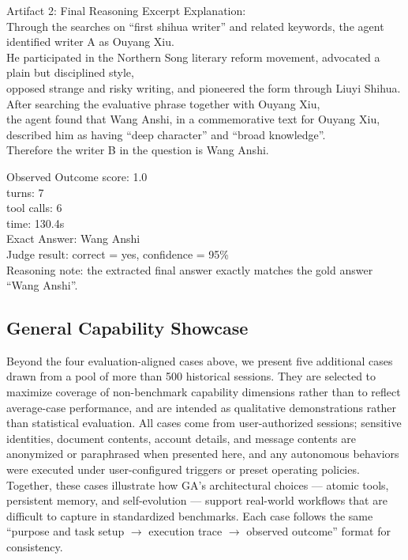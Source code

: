 \begin{CaseTraceBox}{Artifact 2: Final Reasoning Excerpt}
\small\ttfamily
Explanation: \\
Through the searches on ``first shihua writer'' and related keywords, the agent identified writer A as Ouyang Xiu. \\
He participated in the Northern Song literary reform movement, advocated a plain but disciplined style, \\
opposed strange and risky writing, and pioneered the form through Liuyi Shihua. \\
After searching the evaluative phrase together with Ouyang Xiu, \\
the agent found that Wang Anshi, in a commemorative text for Ouyang Xiu, \\
described him as having ``deep character'' and ``broad knowledge''. \\
Therefore the writer B in the question is Wang Anshi.
\end{CaseTraceBox}

\begin{CaseAnswerBox}{Observed Outcome}
\small\ttfamily
score: 1.0 \\
turns: 7 \\
tool calls: 6 \\
time: 130.4s \\
Exact Answer: Wang Anshi \\
Judge result: correct = yes, confidence = 95\% \\
Reasoning note: the extracted final answer exactly matches the gold answer ``Wang Anshi''.
\end{CaseAnswerBox}

\FloatBarrier

\subsection{General Capability Showcase}
\label{app:general_capability_showcase}

Beyond the four evaluation-aligned cases above, we present five additional cases drawn from a pool of more than 500 historical sessions.
They are selected to maximize coverage of non-benchmark capability dimensions rather than to reflect average-case performance, and are intended as qualitative demonstrations rather than statistical evaluation.
All cases come from user-authorized sessions; sensitive identities, document contents, account details, and message contents are anonymized or paraphrased when presented here, and any autonomous behaviors were executed under user-configured triggers or preset operating policies.
Together, these cases illustrate how GA's architectural choices --- atomic tools, persistent memory, and self-evolution --- support real-world workflows that are difficult to capture in standardized benchmarks.
Each case follows the same ``purpose and task setup $\rightarrow$ execution trace $\rightarrow$ observed outcome'' format for consistency.

